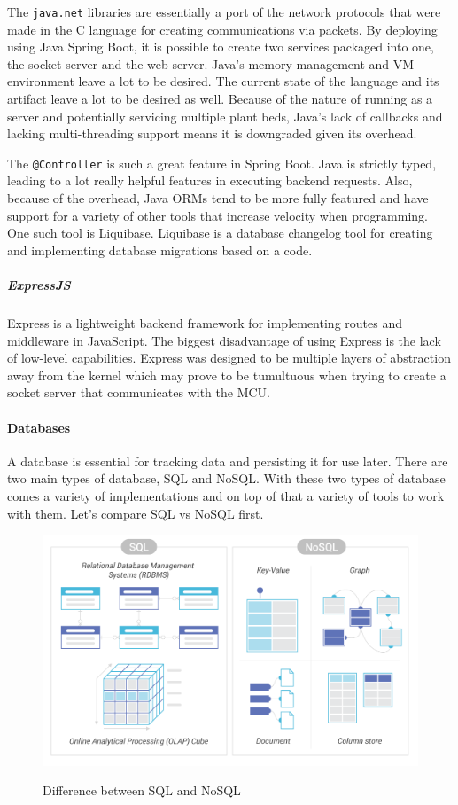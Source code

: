 The \verb|java.net| libraries are essentially a port of the network protocols that were made in the C language for creating communications via packets. By deploying using Java Spring Boot, it is possible to create two services packaged into one, the socket server and the web server. Java's memory management and VM environment leave a lot to be desired. The current state of the language and its artifact leave a lot to be desired as well. Because of the nature of running as a server and potentially servicing multiple plant beds, Java's lack of callbacks and lacking multi-threading support means it is downgraded given its overhead.

The \verb|@Controller| is such a great feature in Spring Boot. Java is strictly typed, leading to a lot really helpful features in executing backend requests. Also, because of the overhead, Java ORMs tend to be more fully featured and have support for a variety of other tools that increase velocity when programming. One such tool is Liquibase. Liquibase is a database changelog tool for creating and implementing database migrations based on a code.

\subparagraph{ExpressJS}
Express is a lightweight backend framework for implementing routes and middleware in JavaScript. The biggest disadvantage of using Express is the lack of low-level capabilities. Express was designed to be multiple layers of abstraction away from the kernel which may prove to be tumultuous when trying to create a socket server that communicates with the MCU.
\paragraph{Databases}
A database is essential for tracking data and persisting it for use later. There are two main types of database, SQL and NoSQL. With these two types of database comes a variety of implementations and on top of that a variety of tools to work with them. Let's compare SQL vs NoSQL first.

\begin{figure}[H]
    \caption{Difference between SQL and NoSQL}
    \centering
    \includegraphics[width=\textwidth]{images/SQL-vs-NoSQL.png}
    \label{fig:sql_vs_nosql}
\end{figure}

